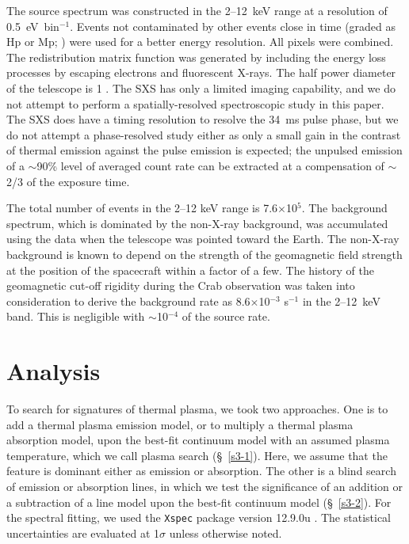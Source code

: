 \documentclass[]{pasj01}
\begin{document}
The source spectrum was constructed in the 2--12~keV range at a resolution of
0.5~eV~bin$^{-1}$. Events not contaminated by other events close in time (graded as Hp
or Mp; \cite{kelley16}) were used for a better energy resolution. All pixels were
combined. The redistribution matrix function was generated by including the energy loss
processes by escaping electrons and fluorescent X-rays. The half power diameter of the
telescope is 1 \citep{okajima16}. The SXS has only a limited imaging capability,
and we do not attempt to perform a spatially-resolved spectroscopic study in this
paper. The SXS does have a timing resolution to resolve the 34~ms pulse phase, but we do
not attempt a phase-resolved study either as only a small gain in the contrast of
thermal emission against the pulse emission is expected; the unpulsed emission of a
$\sim$90\% level of averaged count rate can be extracted at a compensation of $\sim$2/3
of the exposure time.

The total number of events in the 2--12 keV range is 7.6$\times$10$^{5}$. The background
spectrum, which is dominated by the non-X-ray background, was accumulated using the data
when the telescope was pointed toward the Earth. The non-X-ray background is known to
depend on the strength of the geomagnetic field strength at the position of the
spacecraft within a factor of a few. The history of the geomagnetic cut-off rigidity
during the Crab observation was taken into consideration to derive the background rate
as 8.6$\times$10$^{-3}$ s$^{-1}$ in the 2--12~keV band. This is negligible with
$\sim$10$^{-4}$ of the source rate.


\section{Analysis}\label{s3}
To search for signatures of thermal plasma, we took two approaches. One is to add a
thermal plasma emission model, or to multiply a thermal plasma absorption model, upon
the best-fit continuum model with an assumed plasma temperature, which we call plasma
search (\S~\ref{s3-1}). Here, we assume that the feature is dominant either as emission
or absorption. The other is a blind search of emission or absorption lines, in which we
test the significance of an addition or a subtraction of a line model upon the best-fit
continuum model (\S~\ref{s3-2}). For the spectral fitting, we used the \texttt{Xspec}
package version 12.9.0u \citep{arnaud96}. The statistical uncertainties are evaluated at
1$\sigma$ unless otherwise noted.
\end{document}
